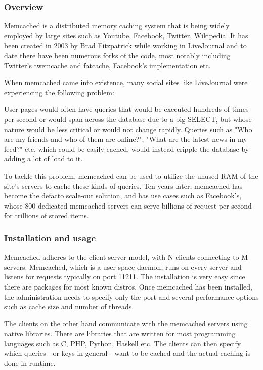 \subsubsection{Overview}

Memcached is a distributed memory caching system that is being widely employed 
by large sites such as Youtube, Facebook, Twitter, Wikipedia. It has been 
created in 2003 by Brad Fitzpatrick while working in LiveJournal and to date 
there have been numerous forks of the code, most notably including Twitter's 
twemcache and fatcache, Facebook's implementation etc.

When memcached came into existence, many social sites like LiveJournal were 
experiencing the following problem:

User pages would often have queries that would be executed hundreds of times 
per second or would span across the database due to a big SELECT, but whose 
nature would be less critical or would not change rapidly. Queries such as "Who 
are my friends and who of them are online?", "What are the latest news in my 
feed?" etc. which could be easily cached, would instead cripple the database by 
adding a lot of load to it.

To tackle this problem, memcached can be used to utilize the unused RAM of the 
site's servers to cache these kinds of queries. Ten years later, memcached has 
become the defacto scale-out solution, and has use cases such as Facebook's, 
whose 800 dedicated memcached servers can serve billions of request per second 
for trillions of stored items\cite{facebook-memcached}.

\subsubsection{Installation and usage}

Memcached adheres to the client server model, with N clients connecting to M 
servers. Memcached, which is a user space daemon, runs on every server and
listens for requests typically on port 11211. The installation is very easy 
since there are packages for most known distros. Once memcached has been 
installed, the administration needs to specify only the port and several 
performance options such as cache size and number of threads.

The clients on the other hand communicate with the memcached servers using 
native libraries. There are libraries that are written for most programming 
languages such as C, PHP, Python, Haskell etc. The clients can then specify 
which queries - or keys in general - want to be cached and the actual caching 
is done in runtime.

